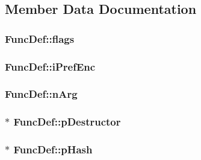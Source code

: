 \subsection{Member Data Documentation}
\hypertarget{struct_func_def_aed4dc88e58b7582668bcaf425c4d053f}{
\subsubsection[{flags}]{ Func\-Def\-::flags}}\label{struct_func_def_aed4dc88e58b7582668bcaf425c4d053f}
\hypertarget{struct_func_def_aa7ed0a0a7d8790a4946ef0dbf85a601c}{
\subsubsection[{i\-Pref\-Enc}]{ Func\-Def\-::i\-Pref\-Enc}}\label{struct_func_def_aa7ed0a0a7d8790a4946ef0dbf85a601c}
\hypertarget{struct_func_def_a4ad90c05868ec8ee60c211b6e20299df}{
\subsubsection[{n\-Arg}]{ Func\-Def\-::n\-Arg}}\label{struct_func_def_a4ad90c05868ec8ee60c211b6e20299df}
\hypertarget{struct_func_def_a1bd12675375b838b5c00b1c79c1e6301}{
\subsubsection[{p\-Destructor}]{$\ast$ Func\-Def\-::p\-Destructor}}\label{struct_func_def_a1bd12675375b838b5c00b1c79c1e6301}
\hypertarget{struct_func_def_a04561444155a6922d6a2d99a29d35281}{
\subsubsection[{p\-Hash}]{$\ast$ Func\-Def\-::p\-Hash}}\label{struct_func_def_a04561444155a6922d6a2d99a29d35281}

